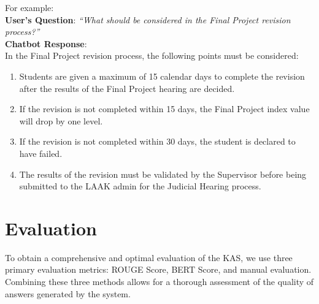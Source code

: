 \documentclass[runningheads]{llncs}
\begin{document}
For example: \\
\textbf{User's Question}: \textit{``What should be considered in the Final Project revision process?''} \\

\textbf{Chatbot Response}: \\
In the Final Project revision process, the following points must be considered:
\begin{enumerate}
    \item Students are given a maximum of 15 calendar days to complete the revision after the results of the Final Project hearing are decided.
    \item If the revision is not completed within 15 days, the Final Project index value will drop by one level.
    \item If the revision is not completed within 30 days, the student is declared to have failed.
    \item The results of the revision must be validated by the Supervisor before being submitted to the LAAK admin for the Judicial Hearing process.
\end{enumerate}


\section{Evaluation}
To obtain a comprehensive and optimal evaluation of the KAS, we use three primary evaluation metrics: ROUGE Score, BERT Score, and manual evaluation. Combining these three methods allows for a thorough assessment of the quality of answers generated by the system.
\end{document}
